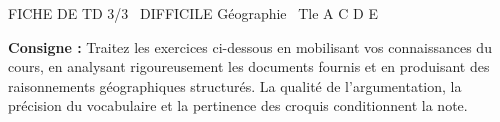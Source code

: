 \documentclass[11pt]{article}
\begin{document}
\begin{tcolorbox}[enhanced,colback=popink,colframe=popink,arc=10pt,boxrule=0pt,left=12pt,right=12pt,top=9pt,bottom=9pt]
{\color{white}\popxbold\small FICHE DE TD 3/3 \textbullet\ DIFFICILE \hfill Géographie \textbullet\ Tle A C D E\par}
\end{tcolorbox}
\vspace{4pt}
\noindent \textbf{Consigne :} Traitez les exercices ci-dessous en mobilisant vos connaissances du cours, en analysant rigoureusement les documents fournis et en produisant des raisonnements géographiques structurés. La qualité de l'argumentation, la précision du vocabulaire et la pertinence des croquis conditionnent la note.
\end{document}

